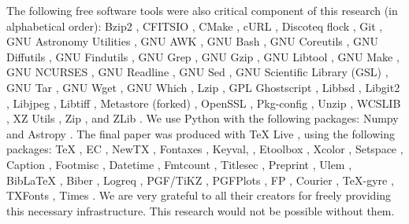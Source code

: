 \documentclass[10pt, twocolumn]{article}
\begin{document}
The following free software tools were also critical component of this
research (in alphabetical order): Bzip2 \bziptwoversion, CFITSIO
\cfitsioversion, CMake \cmakeversion, cURL \curlversion, Discoteq flock
\flockversion, Git \gitversion, GNU Astronomy Utilities \gnuastroversion,
GNU AWK \gawkversion, GNU Bash \bashversion, GNU Coreutils
\coreutilsversion, GNU Diffutils \diffutilsversion, GNU Findutils
\findutilsversion, GNU Grep \grepversion, GNU Gzip \gzipversion, GNU
Libtool \libtoolversion, GNU Make \makeversion, GNU NCURSES
\ncursesversion, GNU Readline \readlineversion, GNU Sed \sedversion, GNU
Scientific Library (GSL) \gslversion, GNU Tar \tarversion, GNU Wget
\wgetversion, GNU Which \whichversion, Lzip \lzipversion, GPL Ghostscript
\ghostscriptversion, Libbsd \libbsdversion, Libgit2 \libgitwoversion,
Libjpeg \libjpegversion, Libtiff \libtiffversion, Metastore (forked)
\metastoreversion, OpenSSL \opensslversion, Pkg-config \pkgconfigversion,
Unzip \unzipversion, WCSLIB \wcslibversion, XZ Utils \xzversion, Zip
\zipversion, and ZLib \zlibversion. We use Python {\pythonversion} with the
following packages: Numpy {\numpyversion} and Astropy {\astropyversion}
\citep{astropy2013, astropy2018}. The final paper was produced with
\TeX{} Live \texliveversion, using the following packages: \TeX{}
\textexversion, EC \texecversion, NewTX \texnewtxversion, Fontaxes
\texfontaxesversion, Keyval, \texxkeyvalversion, Etoolbox
\texetoolboxversion, Xcolor \texxcolorversion, Setspace
\texsetspaceversion, Caption \texcaptionversion, Footmisc
\texfootmiscversion, Datetime \texdatetimeversion, Fmtcount
\texfmtcountversion, Titlesec \textitlesecversion, Preprint
\texpreprintversion, Ulem \texulemversion, Bib\LaTeX{} \texbiblatexversion,
Biber \texbiberversion, Logreq \texlogreqversion, PGF/TiKZ \texpgfversion,
PGFPlots \texpgfplotsversion, FP \texfpversion, Courier \texcourierversion,
\TeX-gyre \textexgyreversion, TXFonts \textxfontsversion, Times
\textimesversion. We are very grateful to all their creators for freely
providing this necessary infrastructure. This research would not be
possible without them.

\printbibliography

\end{document}
